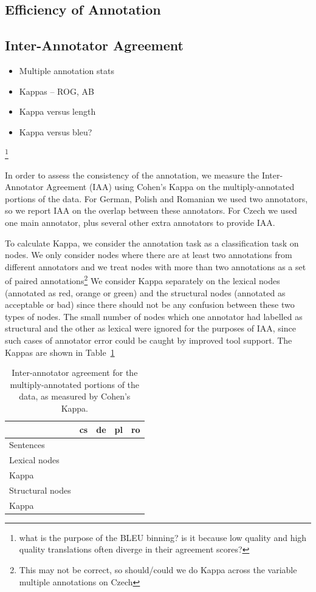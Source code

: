 \documentclass[11pt]{article}
\newcommand{\tabref}[1]{Table~\ref{#1}}
\newcommand{\oa}[1]{\footnote{\color{red} #1}}
\newcommand{\bh}[2]{\footnote{\color{blue} #1}}
\begin{document}
\subsection{Efficiency of Annotation}\label{sec:efficiency}



\subsection{Inter-Annotator Agreement}
\begin{itemize}
  \item Multiple annotation stats
  \item Kappas -- ROG, AB
  \item Kappa versus length
  \item Kappa versus bleu?
\end{itemize}

\oa{what is the purpose of the BLEU binning? is it because low quality and high
quality translations often diverge in their agreement scores?}



In order to assess the consistency of the annotation, we measure the Inter-Annotator
Agreement (IAA) using Cohen's Kappa on the multiply-annotated portions of the data.
For German, Polish and Romanian we used two annotators, so we report IAA on the overlap
between these annotators. For Czech we used one main annotator, plus several other extra
annotators to provide IAA. 

To calculate Kappa, we consider the annotation task as a classification task on 
nodes. We only consider nodes where there are at least two annotations from different
annotators and we treat nodes with more than two annotations as a set of paired
annotations\bh{This may not be correct, so should/could we do Kappa across the 
variable multiple annotations on Czech}. We consider Kappa separately on the lexical
nodes (annotated as red, orange or green) and the structural nodes (annotated
as acceptable or bad) since there should not be any confusion between these two types of
nodes. The small number of nodes which one annotator had labelled as structural and 
the other as lexical were ignored for the purposes of IAA, since such cases of annotator 
error could be caught by improved tool support.  The Kappas are shown in \tabref{tab:iaa}
\begin{table}[!ht]
\begin{center}
\begin{tabular}{l|cccc}
 & cs & de & pl & ro \\
\hline
Sentences & & & & \\
\hline
Lexical nodes & & & & \\
Kappa & & & & \\
\hline
Structural nodes & & & & \\
Kappa & & & & \\
\end{tabular}
\caption{Inter-annotator agreement for the multiply-annotated portions of the data, as
measured by Cohen's Kappa. }
\label{tab:iaa}
\end{center}
\end{table}
\end{document}
